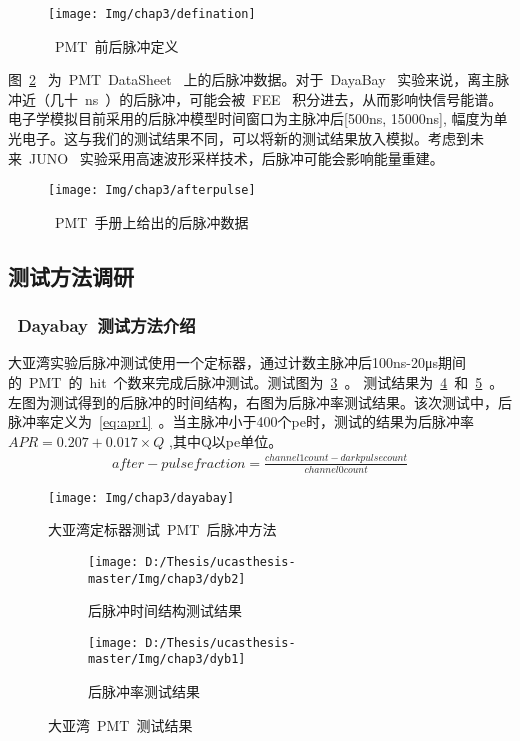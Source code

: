  \begin{figure}[!htbp]
  \centering
   \texttt{[image: Img/chap3/defination]}
    \caption{~PMT~前后脉冲定义}
  \label{fig:defination}
\end{figure}
 
 
  
  图~\ref{fig:afterpulse}~ 为~PMT~DataSheet~ 上的后脉冲数据。对于~DayaBay~ 实验来说，离主脉冲近（几十~ns~）的后脉冲，可能会被~FEE~ 积分进去，从而影响快信号能谱。电子学模拟目前采用的后脉冲模型时间窗口为主脉冲后[500ns, 15000ns], 幅度为单光电子。这与我们的测试结果不同，可以将新的测试结果放入模拟。考虑到未来~JUNO~ 实验采用高速波形采样技术，后脉冲可能会影响能量重建。



 \begin{figure}[!htbp]
  \centering
   \texttt{[image: Img/chap3/afterpulse]}
    \caption{~PMT~手册上给出的后脉冲数据}
  \label{fig:afterpulse}
\end{figure}





\subsection{测试方法调研}
\subsubsection{~Dayabay~测试方法介绍}
大亚湾实验后脉冲测试使用一个定标器，通过计数主脉冲后100ns-20μs期间的~PMT~的~hit~个数来完成后脉冲测试。测试图为~\ref{fig:dayabay}~。 测试结果为~\ref{fig:dyb_1}~和~\ref{fig:dyb_2}~。左图为测试得到的后脉冲的时间结构，右图为后脉冲率测试结果。该次测试中，后脉冲率定义为~\ref{eq:apr1}~。当主脉冲小于400个pe时，测试的结果为后脉冲率$ APR=0.207+0.017 \times Q $ ,其中Q以pe单位。
\begin{eqnarray}\label{eq:apr1}
after-pulse fraction=\frac{channel 1 count -dark pulse count}{channel 0 count}
\end{eqnarray}

 \begin{figure}[!htbp]
  \centering
   \texttt{[image: Img/chap3/dayabay]}
    \caption{大亚湾定标器测试~PMT~后脉冲方法}
  \label{fig:dayabay}
\end{figure}



\begin{figure}[!htbp]
  \centering
  \begin{subfigure}[b]{\MySubFactor\textwidth}
    \texttt{[image: D:/Thesis/ucasthesis-master/Img/chap3/dyb2]}
    \caption{后脉冲时间结构测试结果}
    \label{fig:dyb_1}
  \end{subfigure}%
  \quad\quad\quad\quad%
  \begin{subfigure}[b]{\MySubFactor\textwidth}
    \texttt{[image: D:/Thesis/ucasthesis-master/Img/chap3/dyb1]}
    \caption{后脉冲率测试结果}
    \label{fig:dyb_2}
  \end{subfigure}
  \caption{大亚湾~PMT~测试结果}
  \label{fig:dyb}
\end{figure}


